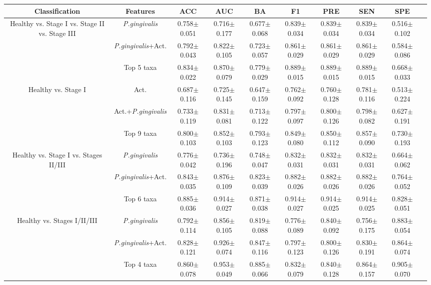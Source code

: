 \begin{tabular}{c|ccccccccc}
    \textbf{Classification} & \textbf{Features} & \textbf{ACC} & \textbf{AUC} & \textbf{BA} & \textbf{F1} & \textbf{PRE} & \textbf{SEN} & \textbf{SPE} & \\
    \hline
    Healthy vs. Stage I vs. Stage II vs. Stage III & \textit{P.gingivalis} & 0.758$\pm$0.051 & 0.716$\pm$0.177 & 0.677$\pm$0.068 & 0.839$\pm$0.034 & 0.839$\pm$0.034 & 0.839$\pm$0.034 & 0.516$\pm$0.102 &  \\
     & \textit{P.gingivalis}+Act. & 0.792$\pm$0.043 & 0.822$\pm$0.105 & 0.723$\pm$0.057 & 0.861$\pm$0.029 & 0.861$\pm$0.029 & 0.861$\pm$0.029 & 0.584$\pm$0.086 &  \\
     & Top 5 taxa & 0.834$\pm$0.022 & 0.870$\pm$0.079 & 0.779$\pm$0.029 & 0.889$\pm$0.015 & 0.889$\pm$0.015 & 0.889$\pm$0.015 & 0.668$\pm$0.033 &  \\
    Healthy vs. Stage I & Act. & 0.687$\pm$0.116 & 0.725$\pm$0.145 & 0.647$\pm$0.159 & 0.762$\pm$0.092 & 0.760$\pm$0.128 & 0.781$\pm$0.116 & 0.513$\pm$0.224 &  \\
     & Act.+\textit{P.gingivalis} & 0.733$\pm$0.119 & 0.831$\pm$0.081 & 0.713$\pm$0.122 & 0.797$\pm$0.097 & 0.800$\pm$0.126 & 0.798$\pm$0.082 & 0.627$\pm$0.191 &  \\
     & Top 9 taxa & 0.800$\pm$0.103 & 0.852$\pm$0.103 & 0.793$\pm$0.123 & 0.849$\pm$0.080 & 0.850$\pm$0.112 & 0.857$\pm$0.090 & 0.730$\pm$0.193 &  \\
    Healthy vs. Stage I vs. Stages II/III & \textit{P.gingivalis} & 0.776$\pm$0.042 & 0.736$\pm$0.196 & 0.748$\pm$0.047 & 0.832$\pm$0.031 & 0.832$\pm$0.031 & 0.832$\pm$0.031 & 0.664$\pm$0.062 &  \\
     & \textit{P.gingivalis}+Act. & 0.843$\pm$0.035 & 0.876$\pm$0.109 & 0.823$\pm$0.039 & 0.882$\pm$0.026 & 0.882$\pm$0.026 & 0.882$\pm$0.026 & 0.764$\pm$0.052 &  \\
     & Top 6 taxa & 0.885$\pm$0.036 & 0.914$\pm$0.027 & 0.871$\pm$0.038 & 0.914$\pm$0.027 & 0.914$\pm$0.025 & 0.914$\pm$0.025 & 0.828$\pm$0.051 &  \\
    Healthy vs. Stages I/II/III & \textit{P.gingivalis} & 0.792$\pm$0.114 & 0.856$\pm$0.105 & 0.819$\pm$0.088 & 0.776$\pm$0.089 & 0.840$\pm$0.092 & 0.756$\pm$0.175 & 0.883$\pm$0.054 &  \\
     & \textit{P.gingivalis}+Act. & 0.828$\pm$0.121 & 0.926$\pm$0.074 & 0.847$\pm$0.116 & 0.797$\pm$0.123 & 0.800$\pm$0.126 & 0.830$\pm$0.191 & 0.864$\pm$0.074 &  \\
     & Top 4 taxa & 0.860$\pm$0.078 & 0.953$\pm$0.049 & 0.885$\pm$0.066 & 0.832$\pm$0.079 & 0.840$\pm$0.128 & 0.864$\pm$0.157 & 0.905$\pm$0.070 &  \\
\end{tabular}
